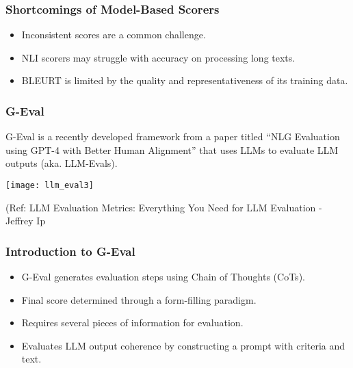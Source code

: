\begin{frame}[fragile]\frametitle{Shortcomings of Model-Based Scorers}
  \begin{itemize}
    \item Inconsistent scores are a common challenge.
    \item NLI scorers may struggle with accuracy on processing long texts.
    \item BLEURT is limited by the quality and representativeness of its training data.
  \end{itemize}
\end{frame}

\begin{frame}[fragile]\frametitle{G-Eval}

G-Eval is a recently developed framework from a paper titled ``NLG Evaluation using GPT-4 with Better Human Alignment'' that uses LLMs to evaluate LLM outputs (aka. LLM-Evals).

\begin{center}
\texttt{[image: llm\_eval3]}
\end{center}		
		
{\tiny (Ref: LLM Evaluation Metrics: Everything You Need for LLM Evaluation - Jeffrey Ip}
			
			
\end{frame}

\begin{frame}[fragile]\frametitle{Introduction to G-Eval}
  \begin{itemize}
    \item G-Eval generates evaluation steps using Chain of Thoughts (CoTs).
    \item Final score determined through a form-filling paradigm.
    \item Requires several pieces of information for evaluation.
    \item Evaluates LLM output coherence by constructing a prompt with criteria and text.
  \end{itemize}
\end{frame}

